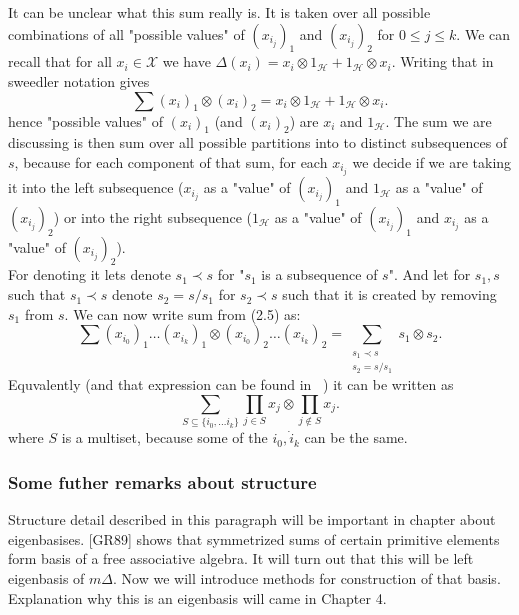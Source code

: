 \documentclass[a4paper, 12pt]{report}
\begin{document}
It can be unclear what this sum really is. It is taken over all possible combinations of all "possible 
values" of $(x_{i_j})_1$ and $(x_{i_j})_2$ for $ 0 \leq j \leq k$. We can recall that for all 
$x_i \in \mathcal{X}$ we 
have $\Delta(x_i) = x_i \otimes 1_\mathcal{H} + 1_\mathcal{H} \otimes x_i$. Writing that in sweedler 
notation gives
\begin{equation*}
\sum(x_i)_1 \otimes (x_i)_2 = x_i \otimes 1_\mathcal{H} + 1_\mathcal{H} \otimes x_i.
\end{equation*}
hence "possible values" of $(x_i)_1$ (and $(x_i)_2$) are $x_i$ and $1_\mathcal{H}$.
The sum we are discussing is then sum over all possible partitions into to distinct subsequences of $s$, 
because for each component of that sum, for each $x_{i_j}$ we decide if we are taking it into the left 
subsequence ($x_{i_j}$ as a "value" of $(x_{i_j})_1$ and $1_\mathcal{H}$ as a "value" of $(x_{i_j})_2$) or 
into the right subsequence ($1_\mathcal{H}$ as a "value" of $(x_{i_j})_1$ and $x_{i_j}$ as a "value" of 
$(x_{i_j})_2$).
\\ For denoting it lets denote $s_1 \prec s$ for "$s_1$ is a subsequence of $s$". And let for $s_1, s$ 
such that $s_1 \prec s$ denote $s_2 = s / s_1$ for $s_2 \prec s$ such that it is created by removing 
$s_1$ from $s$. We can now write sum from (2.5) as:
\begin{equation*}
\sum (x_{i_0})_1 \dots (x_{i_k})_1 \otimes (x_{i_0})_2 \dots (x_{i_k})_2 =
\sum_{\substack{s_1 \prec s \\ s_2 = s / s_1}} s_1 \otimes s_2.
\end{equation*}
Equvalently (and that expression can be found in ~\cite{Diaconis2014}) it can be written as
\begin{equation*}
\sum_{S \subseteq \{ i_0, \dots i_k \} } \prod_{j \in S} x_j \otimes \prod_{j \notin S} x_j.
\end{equation*}
where $S$ is a multiset, because some of the $i_0, \dot i_k$ can be the same.
\subsubsection{Some futher remarks about structure}
Structure detail described in this paragraph will be important in chapter about eigenbasises. 
[GR89] shows that symmetrized sums of certain primitive elements form basis of a free associative algebra. 
It will turn out that this will be left eigenbasis of $m\Delta$. Now we will introduce methods for 
construction of that basis. Explanation why this is an eigenbasis will came in Chapter 4. \\
\end{document}

